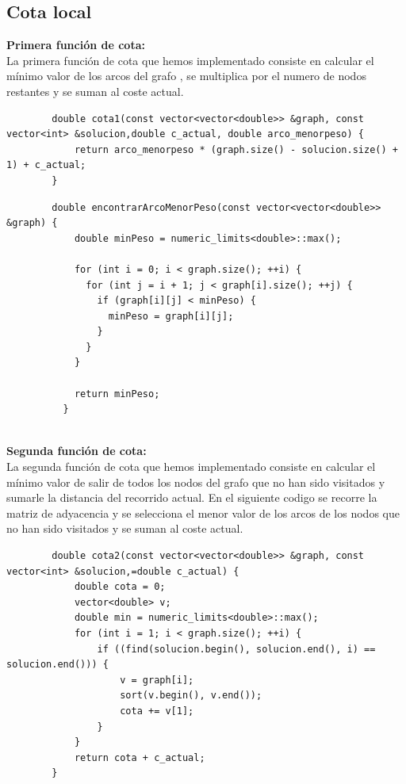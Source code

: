 \documentclass[11pt,openany]{book}
\begin{document}
\subsection{Cota local}
\textbf{Primera función de cota:} \\
    La primera función de cota que hemos implementado consiste en calcular el mínimo valor de los arcos del grafo ,
     se multiplica por el numero de nodos restantes y se suman al coste actual.
    \begin{lstlisting}
        double cota1(const vector<vector<double>> &graph, const vector<int> &solucion,double c_actual, double arco_menorpeso) {
            return arco_menorpeso * (graph.size() - solucion.size() + 1) + c_actual;
        }

    \end{lstlisting}
    \begin{lstlisting}
        double encontrarArcoMenorPeso(const vector<vector<double>> &graph) {
            double minPeso = numeric_limits<double>::max();
          
            for (int i = 0; i < graph.size(); ++i) {
              for (int j = i + 1; j < graph[i].size(); ++j) {
                if (graph[i][j] < minPeso) {
                  minPeso = graph[i][j];
                }
              }
            }
          
            return minPeso;
          }
          

    \end{lstlisting}
\textbf{Segunda función de cota:} \\
    La segunda función de cota que hemos implementado consiste en calcular el mínimo valor de salir de todos los nodos del grafo que no 
    han sido visitados y sumarle la distancia del recorrido actual.
    En el siguiente codigo se recorre la matriz de adyacencia y se selecciona el menor valor de los arcos de los nodos que no han sido visitados 
    y se suman al coste actual.
    \begin{lstlisting}
        double cota2(const vector<vector<double>> &graph, const vector<int> &solucion,=double c_actual) {
            double cota = 0;
            vector<double> v;
            double min = numeric_limits<double>::max();
            for (int i = 1; i < graph.size(); ++i) {
                if ((find(solucion.begin(), solucion.end(), i) == solucion.end())) {
                    v = graph[i];
                    sort(v.begin(), v.end());
                    cota += v[1];
                }
            }
            return cota + c_actual;
        }
    \end{lstlisting}
\end{document}
